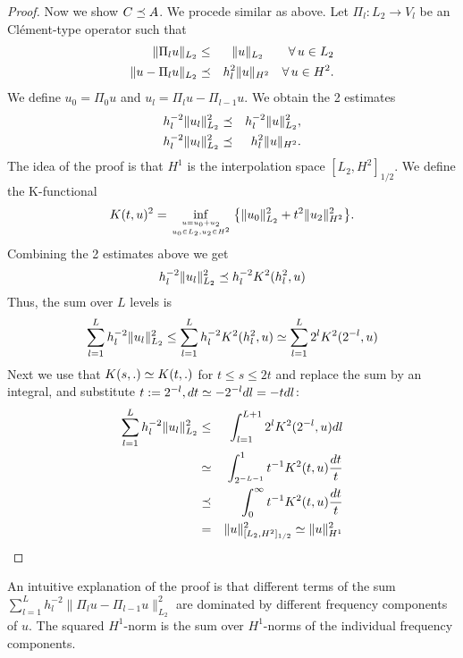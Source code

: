 \begin{proof}
Now we show $C \preceq A$. We procede similar as above. 
Let $\Pi_l : L_2 \rightarrow V_l$ be an Cl\'ement-type operator 
such that
\begin{eqnarray*}
\| \Pi_l u \|_{L_2} & \leq & \| u \|_{L_2}  \qquad \forall \, u \in L_2 \\
\| u - \Pi_l u \|_{L_2} & \preceq & h_l^2 \| u \|_{H^2} \quad \forall \, u \in H^2.
\end{eqnarray*}
We define $u_0 = \Pi_0 u$ and $u_l = \Pi_l u - \Pi_{l-1} u$. We obtain
the 2 estimates
\begin{eqnarray*}
h_l^{-2} \| u_l \|_{L_2}^2 & \preceq & h_l^{-2} \| u \|_{L_2}^2, \\
h_l^{-2} \| u_l \|_{L_2}^2 & \preceq & h_l^2 \| u \|_{H^2}.
\end{eqnarray*}
The idea of the proof is that $H^1$ is the interpolation space $[L_2, H^2]_{1/2}$. We define the K-functional
$$
K(t,u)^2 = \inf_{u = u_0 + u_2 \atop u_0 \in L_2, u_2 \in H^2}
\big\{ \| u_0 \|_{L_2}^2 + t^2 \| u_2 \|_{H^2}^2 \big\}.
$$
Combining the 2 estimates above we get
$$
h_l^{-2} \| u_l \|_{L_2}^2 \preceq h_l^{-2} K^2 (h_l^2, u)
$$
Thus, the sum over $L$ levels is
$$
\sum_{l=1}^L h_l^{-2} \| u_l \|_{L_2}^2 \leq \sum_{l=1}^L h_l^{-2} K^2 (h_l^2, u) \simeq \sum_{l=1}^L 2^l K^2(2^{-l}, u)
$$
Next we use that $K(s,.) \simeq K(t,.)$ for $t \leq s \leq 2t$ and replace
the sum by an integral, and substitute $t := 2^{-l}, dt \simeq -2^{-l} dl = -t dl$:
\begin{eqnarray*}
\sum_{l=1}^L h_l^{-2} \| u_l \|_{L_2}^2 & \leq & 
\int_{l=1}^{L+1} 2^l K^2(2^{-l}, u) dl \\
& \simeq & \int_{2^{-L-1}}^1 t^{-1} K^2(t,u) \frac{dt}{t}  \\
& \preceq & \int_0^\infty t^{-1} K^2(t,u) \frac{dt}{t} \\
& = & \| u \|_{[L_2,H^2]_{1/2}}^2 \simeq \| u \|_{H^1}^2
\end{eqnarray*}
\end{proof}
An intuitive explanation of the proof is that different terms of 
the sum
$\sum_{l=1}^L h_l^{-2} \| \Pi_l u - \Pi_{l-1} u \|_{L_2}^2$ 
are dominated by different frequency 
components of $u$. The squared $H^1$-norm is the sum over $H^1$-norms of
the individual frequency components.

% 